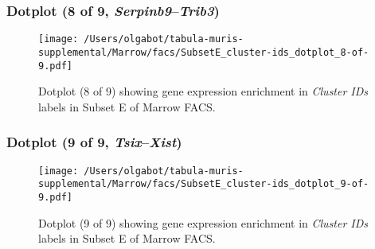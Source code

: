 \clearpage

\subsubsection{Dotplot (8 of 9, \emph{Serpinb9}--\emph{Trib3})}
\begin{figure}[h]
\centering
\texttt{[image: /Users/olgabot/tabula-muris-supplemental/Marrow/facs/SubsetE\_cluster-ids\_dotplot\_8-of-9.pdf]}

\caption{ Dotplot (8 of 9)  showing gene expression enrichment in \emph{Cluster IDs} labels in Subset E of Marrow FACS. }
\end{figure}


\clearpage

\subsubsection{Dotplot (9 of 9, \emph{Tsix}--\emph{Xist})}
\begin{figure}[h]
\centering
\texttt{[image: /Users/olgabot/tabula-muris-supplemental/Marrow/facs/SubsetE\_cluster-ids\_dotplot\_9-of-9.pdf]}

\caption{ Dotplot (9 of 9)  showing gene expression enrichment in \emph{Cluster IDs} labels in Subset E of Marrow FACS. }
\end{figure}

